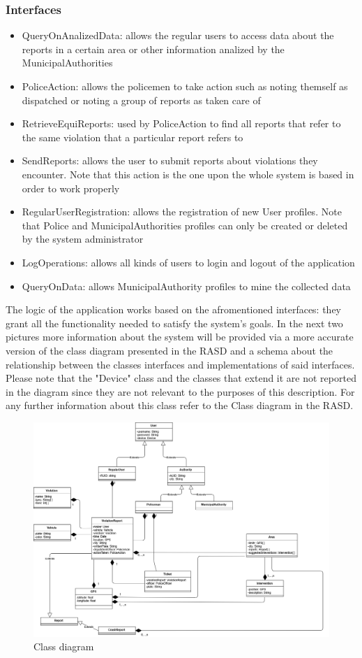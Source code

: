 \subsubsection{Interfaces}
\begin{itemize}
\item QueryOnAnalizedData: allows the regular users to access data about the reports in a certain area or other information analized by the MunicipalAuthorities
\item PoliceAction: allows the policemen to take action such as noting themself as dispatched or noting a group of reports as taken care of
\item RetrieveEquiReports: used by PoliceAction to find all reports that refer to the same violation that a particular report refers to
\item SendReports: allows the user to submit reports about violations they encounter. Note that this action is the one upon the whole system is based in order to work properly
\item RegularUserRegistration: allows the registration of new User profiles. Note that Police and MunicipalAuthorities profiles can only be created or deleted by the system administrator
\item LogOperations: allows all kinds of users to login and logout of the application
\item QueryOnData: allows MunicipalAuthority profiles to mine the collected data
\end{itemize}
The logic of the application works based on the afromentioned interfaces: they grant all the functionality needed to satisfy the system's goals.
In the next two pictures more information about the system will be provided via a more accurate version of the class diagram presented in the RASD and a schema about the relationship between the classes interfaces and implementations of said interfaces. Please note that the "Device" class and the classes that extend it are not reported in the diagram since they are not relevant to the purposes of this description. For any further information about this class refer to the Class diagram in the RASD.
\newpage
\begin{figure}[h!]
	\centering
	\includegraphics[angle=90, scale=0.45]{Images/ADV_class_diagram}
	\caption{Class diagram}
\end{figure}
\newpage

